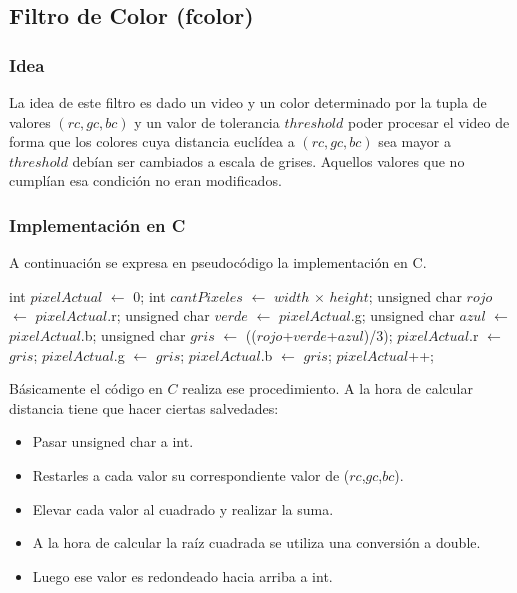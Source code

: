 \subsection{Filtro de Color (fcolor)}
	\subsubsection{Idea}
		La idea de este filtro es dado un video y un color determinado por la tupla de valores $(rc,gc,bc)$ y un valor de tolerancia $threshold$ poder procesar el video de forma que los colores cuya distancia eucl\'idea a $(rc,gc,bc)$ sea mayor a $threshold$ deb\'ian ser cambiados a escala de grises. Aquellos valores que no cumpl\'ian esa condici\'on no eran modificados.
		
	\subsubsection{Implementaci\'on en C}
	
	A continuaci\'on se expresa en pseudoc\'odigo la implementaci\'on en C.
	
	\begin{algorithmic}[1]
		\State int $pixelActual$ $\gets$ 0;
		\State int $cantPixeles$ $\gets$ $width$ $\times$ $height$;
			\State unsigned char $rojo$ $\gets$ $pixelActual$.r;
			\State unsigned char $verde$ $\gets$ $pixelActual$.g;
			\State unsigned char $azul$ $\gets$ $pixelActual$.b;
				\State unsigned char $gris$ $\gets$ (($rojo$+$verde$+$azul$)/3);
				\State $pixelActual$.r $\gets$ $gris$;
				\State $pixelActual$.g $\gets$ $gris$;
				\State $pixelActual$.b $\gets$ $gris$;
			\EndIf
			\State $pixelActual$++;
		\EndWhile
	\end{algorithmic}

	B\'asicamente el c\'odigo en $C$ realiza ese procedimiento. A la hora de calcular distancia tiene que hacer ciertas salvedades:
	
	\begin{itemize}
		\item Pasar unsigned char a int.
		\item Restarles a cada valor su correspondiente valor de ($rc$,$gc$,$bc$).
		\item Elevar cada valor al cuadrado y realizar la suma.
		\item A la hora de calcular la ra\'iz cuadrada se utiliza una conversi\'on a double.
		\item Luego ese valor es redondeado hacia arriba a int.\footnotemark[1]
	\end{itemize}
	
